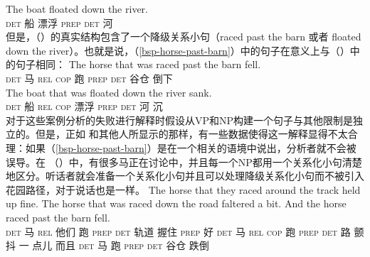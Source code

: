 \ex 
\gll The boat floated down the river.\\
    \textsc{det} 船 漂浮 \textsc{prep} \textsc{det} 河\\
\zl
但是，（）的真实结构包含了一个降级关系小句（raced past the barn 或者 floated down the river）。也就是说，（\ref{bsp-horse-past-barn}）中的句子在意义上与（）中的句子相同：
\eal
\ex 
\gll The horse that was raced past the barn fell.\\
    \textsc{det} 马 \textsc{rel} \textsc{cop} 跑 \textsc{prep} \textsc{det} 谷仓 倒下\\
\ex 
\gll The boat that was floated down the river sank.\\
    \textsc{det} 船 \textsc{rel} \textsc{cop} 漂浮 \textsc{prep} \textsc{det} 河 沉\\
\zl
对于这些案例分析的失败进行解释时假设从VP和NP构建一个句子与其他限制是独立的。但是，正如 \citet{CS85a}和其他人所显示的那样，有一些数据使得这一解释显得不太合理：如果（\ref{bsp-horse-past-barn}）是在一个相关的语境中说出，分析者就不会被误导。在 （）中，有很多马正在讨论中，并且每一个NP都用一个关系化小句清楚地区分。听话者就会准备一个关系化小句并且可以处理降级关系化小句而不被引入花园路径，对于说话也是一样。
\ea
\gll The horse that they raced around the track held up fine. The horse that was raced down the road faltered a bit. And the horse raced past the barn fell.\\
    \textsc{det} 马 \textsc{rel} 他们 跑 \textsc{prep} \textsc{det} 轨道 握住 \textsc{prep} 好 \textsc{det} 马 \textsc{rel} \textsc{cop} 跑 \textsc{prep} \textsc{det} 路 颤抖 一 点儿 而且 \textsc{det} 马 跑 \textsc{prep} \textsc{det}  谷仓 跌倒\\
\z

